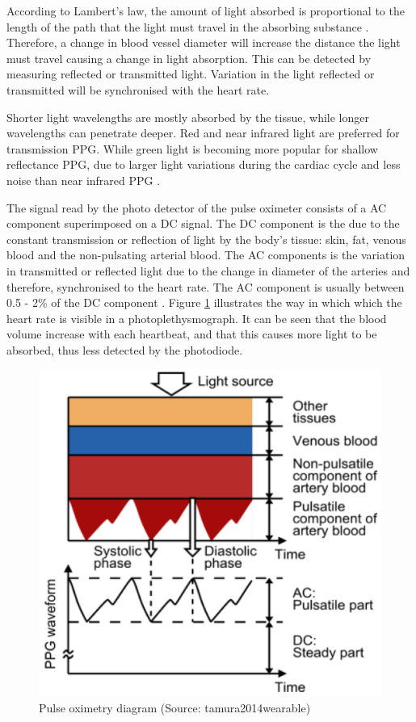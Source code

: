 \medskip
According to Lambert's law, the amount of light absorbed is proportional to the length of the path that the light must travel in the absorbing substance \citep{lambertANDbeer}. Therefore, a change in blood vessel diameter will increase the distance the light must travel causing a change in light absorption. This can be detected by measuring reflected or transmitted light. Variation in the light reflected or transmitted will be synchronised with the heart rate.

\medskip
Shorter light wavelengths are mostly absorbed by the tissue, while longer wavelengths can penetrate deeper. Red and near infrared light are preferred for transmission PPG. While green light is becoming more popular for shallow reflectance PPG, due to larger light variations during the cardiac cycle and less noise than near infrared PPG \citep{tamura2014wearable}.

\medskip

The signal read by the photo detector of the pulse oximeter consists of a AC component superimposed on a DC signal. The DC component is the due to the constant transmission or reflection of light by the body's tissue: skin, fat, venous blood and the non-pulsating arterial blood. The AC components is the variation in transmitted or reflected light due to the change in diameter of the arteries and therefore, synchronised to the heart rate. The AC component is usually between 0.5 - 2\% of the DC component \citep{tavakoli2006analog}. Figure \ref{fig:PPG} illustrates the way in which which the heart rate is visible in a photoplethysmograph. It can be seen that the blood volume increase with each heartbeat, and that this causes more light to be absorbed, thus less detected by the photodiode.

\medskip

\begin{figure}[h]
   \centering
   \includegraphics[scale=1.6]{figs/PPG}
   \caption{Pulse oximetry diagram (Source: tamura2014wearable)}
   \label{fig:PPG}
\end{figure}

